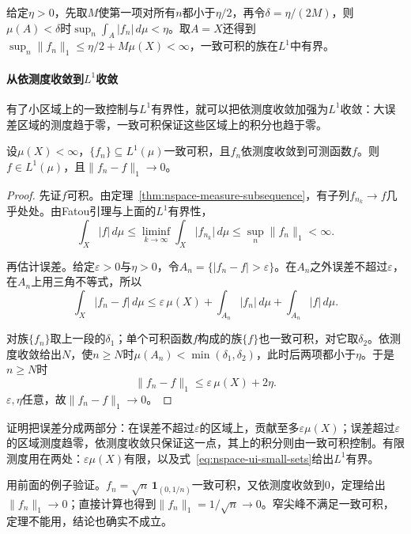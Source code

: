 给定$\eta>0$，先取$M$使第一项对所有$n$都小于$\eta/2$，再令$\delta=\eta/(2M)$，则$\mu(A)<\delta$时$\sup_n\int_A\lvert f_n\rvert\,d\mu<\eta$。取$A=X$还得到$\sup_n\lVert f_n\rVert_1\leq\eta/2+M\mu(X)<\infty$，一致可积的族在$L^1$中有界。

\paragraph{从依测度收敛到\texorpdfstring{$L^1$}{L1}收敛}
有了小区域上的一致控制与$L^1$有界性，就可以把依测度收敛加强为$L^1$收敛：大误差区域的测度趋于零，一致可积保证这些区域上的积分也趋于零。

\begin{theorem}
\label{thm:nspace-vitali}
设$\mu(X)<\infty$，$\{f_n\}\subseteq L^1(\mu)$一致可积，且$f_n$依测度收敛到可测函数$f$。则$f\in L^1(\mu)$，且$\lVert f_n-f\rVert_1\to0$。
\end{theorem}

\begin{proof}
先证$f$可积。由定理~\ref{thm:nspace-measure-subsequence}，有子列$f_{n_k}\to f$几乎处处。由Fatou引理与上面的$L^1$有界性，
\[
 \int_X\lvert f\rvert\,d\mu\leq\liminf_{k\to\infty}\int_X\lvert f_{n_k}\rvert\,d\mu\leq\sup_n\lVert f_n\rVert_1<\infty.
\]

再估计误差。给定$\varepsilon>0$与$\eta>0$，令$A_n=\{\lvert f_n-f\rvert>\varepsilon\}$。在$A_n$之外误差不超过$\varepsilon$，在$A_n$上用三角不等式，所以
\[
 \int_X\lvert f_n-f\rvert\,d\mu\leq\varepsilon\,\mu(X)+\int_{A_n}\lvert f_n\rvert\,d\mu+\int_{A_n}\lvert f\rvert\,d\mu.
\]

对族$\{f_n\}$取上一段的$\delta_1$；单个可积函数$f$构成的族$\{f\}$也一致可积，对它取$\delta_2$。依测度收敛给出$N$，使$n\geq N$时$\mu(A_n)<\min(\delta_1,\delta_2)$，此时后两项都小于$\eta$。于是$n\geq N$时
\[
 \lVert f_n-f\rVert_1\leq\varepsilon\,\mu(X)+2\eta.
\]
$\varepsilon,\eta$任意，故$\lVert f_n-f\rVert_1\to0$。
\end{proof}

证明把误差分成两部分：在误差不超过$\varepsilon$的区域上，贡献至多$\varepsilon\mu(X)$；误差超过$\varepsilon$的区域测度趋零，依测度收敛只保证这一点，其上的积分则由一致可积控制。有限测度用在两处：$\varepsilon\mu(X)$有限，以及式~\eqref{eq:nspace-ui-small-sets}给出$L^1$有界。

用前面的例子验证。$f_n=\sqrt n\,\mathbf 1_{(0,1/n)}$一致可积，又依测度收敛到$0$，定理给出$\lVert f_n\rVert_1\to0$；直接计算也得到$\lVert f_n\rVert_1=1/\sqrt n\to0$。窄尖峰不满足一致可积，定理不能用，结论也确实不成立。

